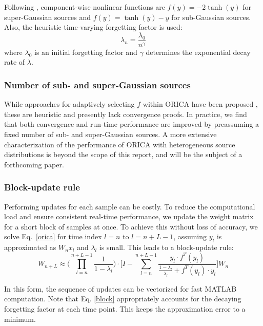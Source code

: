 \documentclass[letterpaper, 10 pt, conference]{ieeeconf}  %
\begin{document}
Following \cite{akhtar2012recursive}, component-wise nonlinear functions are $f(y)=-2\tanh(y)$ for super-Gaussian sources and $f(y)=\tanh(y)-y$ for sub-Gaussian sources. Also, the heuristic time-varying forgetting factor is used:
\[\lambda_n=\frac{\lambda_0}{n^{\gamma}}\]
where $\lambda_0$ is an initial forgetting factor and $\gamma$ determines the exponential decay rate of $\lambda$. 

\subsubsection{Number of sub- and super-Gaussian sources}
While approaches for adaptively selecting $f$ within ORICA have been proposed \cite{akhtar2012recursive}, these are heuristic and presently lack convergence proofs. %
In practice, we find that both convergence and run-time performance are improved by preassuming a fixed number of sub- and super-Gaussian sources. A more extensive characterization of the performance of ORICA with heterogeneous source distributions is beyond the scope of this report, and will be the subject of a forthcoming paper.

\subsubsection{Block-update rule}
Performing updates for each sample can be costly. To reduce the computational load and ensure consistent real-time performance, we update the weight matrix for a short block of samples at once. To achieve this without loss of accuracy, we solve Eq.~\ref{orica} for time index $l=n$ to $l=n+L-1$, assuming $y_l$ is approximated as $W_n x_l$ and $\lambda_l$ is small. This leads to a block-update rule:
\begin{equation} \label{block}
W_{n+L} \approx \big( \prod_{l=n}^{n+L-1}\frac{1}{1-\lambda_l}\big) \cdot \Big[ I - \sum_{l=n}^{n+L-1} \frac{y_l\cdot f^T(y_l)} {\frac{1-\lambda_l}{\lambda_l} + f^T(y_l)\cdot y_l} \Big] W_n
\end{equation}

In this form, the sequence of updates can be vectorized for fast MATLAB computation. Note that Eq. \ref{block} appropriately accounts for the decaying forgetting factor at each time point. This keeps the approximation error to a minimum.
\end{document}

